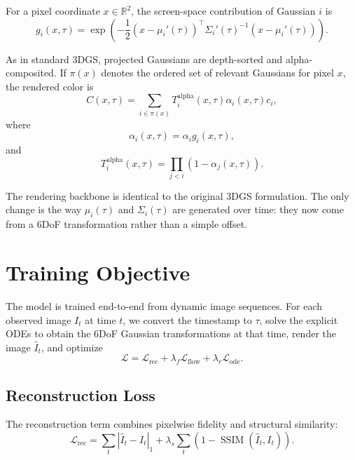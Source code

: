 \documentclass[11pt]{article}
\begin{document}
For a pixel coordinate $x\in\mathbb{R}^2$, the screen-space contribution of Gaussian $i$ is
\begin{equation}
g_i(x,\tau) = \exp \left( -\frac{1}{2} (x-\mu_i'(\tau))^\top \Sigma_i'(\tau)^{-1} (x-\mu_i'(\tau)) \right).
\end{equation}

As in standard 3DGS, projected Gaussians are depth-sorted and alpha-composited. If $\pi(x)$ denotes the ordered set of relevant Gaussians for pixel $x$, the rendered color is
\begin{equation}
C(x,\tau) = \sum_{i\in\pi(x)} T_i^{\text{alpha}}(x,\tau) \alpha_i(x,\tau) c_i,
\end{equation}
where
\begin{equation}
\alpha_i(x,\tau) = \alpha_i g_i(x,\tau),
\end{equation}
and
\begin{equation}
T_i^{\text{alpha}}(x,\tau) = \prod_{j<i} \left( 1-\alpha_j(x,\tau) \right).
\end{equation}

The rendering backbone is identical to the original 3DGS formulation. The only change is the way $\mu_i(\tau)$ and $\Sigma_i(\tau)$ are generated over time: they now come from a 6DoF transformation rather than a simple offset.

\section{Training Objective}

The model is trained end-to-end from dynamic image sequences. For each observed image $I_t$ at time $t$, we convert the timestamp to $\tau$, solve the explicit ODEs to obtain the 6DoF Gaussian transformations at that time, render the image $\hat I_t$, and optimize
\begin{equation}
\mathcal{L} = \mathcal{L}_{\text{rec}} + \lambda_f \mathcal{L}_{\text{flow}} + \lambda_r \mathcal{L}_{\text{ode}}.
\end{equation}

\subsection{Reconstruction Loss}

The reconstruction term combines pixelwise fidelity and structural similarity:
\begin{equation}
\mathcal{L}_{\text{rec}} = \sum_t |\hat I_t-I_t|_1 + \lambda_s \sum_t \left( 1-\operatorname{SSIM}(\hat I_t,I_t) \right).
\end{equation}
\end{document}
